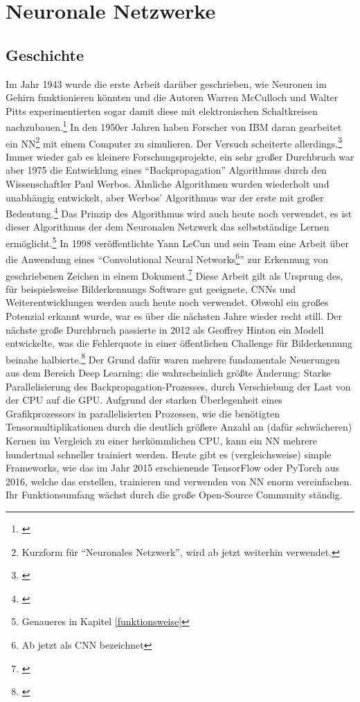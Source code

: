 \section{Neuronale Netzwerke}

\subsection{Geschichte}

Im Jahr 1943 wurde die erste Arbeit darüber geschrieben, wie Neuronen im Gehirn funktionieren könnten und die Autoren Warren McCulloch und Walter Pitts experimentierten sogar damit diese mit elektronischen Schaltkreisen nachzubauen.\footnote{\cite[]{alogicalcalculus}} In den 1950er Jahren haben Forscher von IBM daran gearbeitet ein NN\footnote{Kurzform für "`Neuronales Netzwerk"', wird ab jetzt weiterhin verwendet.} mit einem Computer zu simulieren. Der Versuch scheiterte allerdings.\footnote{\cite[Absatz 3]{nnhistory}} Immer wieder gab es kleinere Forschungsprojekte, ein sehr großer Durchbruch war aber 1975 die Entwicklung eines "`Backpropagation"' Algorithmus durch den Wissenschaftler Paul Werbos. Ähnliche Algorithmen wurden wiederholt und unabhängig entwickelt, aber Werbos' Algorithmus war der erste mit großer Bedeutung.\footnote{\cite[]{paulwerbosbackpropagation}} Das Prinzip des Algorithmus wird auch heute noch verwendet, es ist dieser Algorithmus der dem Neuronalen Netzwerk das selbstständige Lernen ermöglicht.\footnote{Genaueres in Kapitel \ref{funktionsweise}} In 1998 veröffentlichte Yann LeCun und sein Team eine Arbeit über die Anwendung eines "`Convolutional Neural Networks\footnote{Ab jetzt als CNN bezeichnet}"' zur Erkennung von geschriebenen Zeichen in einem Dokument.\footnote{\cite[]{cnnhistory}} Diese Arbeit gilt als Ursprung des, für beispielsweise Bilderkennungs Software gut geeignete, CNNs und Weiterentwicklungen werden auch heute noch verwendet. Obwohl ein großes Potenzial erkannt wurde, war es über die nächsten Jahre wieder recht still. Der nächste große Durchbruch passierte in 2012 als Geoffrey Hinton ein Modell entwickelte, was die Fehlerquote in einer öffentlichen Challenge für Bilderkennung beinahe halbierte.\footnote{\cite[]{geoffrey}} Der Grund dafür waren mehrere fundamentale Neuerungen aus dem Bereich Deep Learning; die wahrscheinlich größte Änderung: Starke Parallelisierung des Backpropagation-Prozesses, durch Verschiebung der Last von der CPU auf die GPU. Aufgrund der starken Überlegenheit eines Grafikprozessors in parallelisierten Prozessen, wie die benötigten Tensormultiplikationen durch die deutlich größere Anzahl an (dafür schwächeren) Kernen im Vergleich zu einer herkömmlichen CPU, kann ein NN mehrere hundertmal schneller trainiert werden. Heute gibt es (vergleichsweise) simple Frameworks, wie das im Jahr 2015 erschienende TensorFlow oder PyTorch aus 2016, welche das erstellen, trainieren und verwenden von NN enorm vereinfachen. Ihr Funktionsumfang wächst durch die große Open-Source Community ständig.


